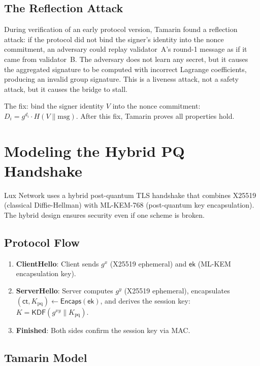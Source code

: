 \documentclass[11pt,a4paper]{article}
\begin{document}
\subsection{The Reflection Attack}

During verification of an early protocol version, Tamarin found a reflection attack: if
the protocol did not bind the signer's identity into the nonce commitment, an adversary
could replay validator~A's round-1 message as if it came from validator~B. The adversary
does not learn any secret, but it causes the aggregated signature to be computed with
incorrect Lagrange coefficients, producing an invalid group signature. This is a liveness
attack, not a safety attack, but it causes the bridge to stall.

The fix: bind the signer identity $V$ into the nonce commitment: $D_i = g^{d_i} \cdot H(V \| \text{msg})$.
After this fix, Tamarin proves all properties hold.

\section{Modeling the Hybrid PQ Handshake}

Lux Network uses a hybrid post-quantum TLS handshake that combines X25519 (classical
Diffie-Hellman) with ML-KEM-768 (post-quantum key encapsulation). The hybrid design
ensures security even if one scheme is broken.

\subsection{Protocol Flow}

\begin{enumerate}
  \item \textbf{ClientHello}: Client sends $g^x$ (X25519 ephemeral) and $\mathsf{ek}$
    (ML-KEM encapsulation key).
  \item \textbf{ServerHello}: Server computes $g^y$ (X25519 ephemeral), encapsulates
    $(\mathsf{ct}, K_{\text{pq}}) \leftarrow \mathsf{Encaps}(\mathsf{ek})$, and derives
    the session key: $K = \mathsf{KDF}(g^{xy} \| K_{\text{pq}})$.
  \item \textbf{Finished}: Both sides confirm the session key via MAC.
\end{enumerate}

\subsection{Tamarin Model}
\end{document}
